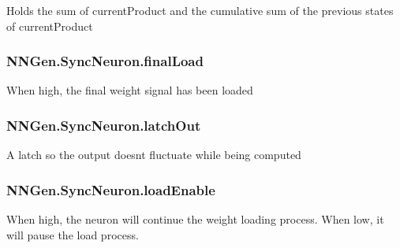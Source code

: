 Holds the sum of current\+Product and the cumulative sum of the previous states of current\+Product 

\hypertarget{class_n_n_gen_1_1_sync_neuron_a871ce93f3b672a3425fec4ee5d55a5d5}{}
\subsubsection[{final\+Load}]{ N\+N\+Gen.\+Sync\+Neuron.\+final\+Load\hspace{0.3cm}{\ttfamily [get]}}\label{class_n_n_gen_1_1_sync_neuron_a871ce93f3b672a3425fec4ee5d55a5d5}


When high, the final weight signal has been loaded 

\hypertarget{class_n_n_gen_1_1_sync_neuron_ac80f32363948c3482290c24ef800fb8d}{}
\subsubsection[{latch\+Out}]{ N\+N\+Gen.\+Sync\+Neuron.\+latch\+Out\hspace{0.3cm}{\ttfamily [get]}}\label{class_n_n_gen_1_1_sync_neuron_ac80f32363948c3482290c24ef800fb8d}


A latch so the output doesn\textquotesingle{}t fluctuate while being computed 

\hypertarget{class_n_n_gen_1_1_sync_neuron_a5cb034f95e9d284d3638f9e817c3f26f}{}
\subsubsection[{load\+Enable}]{ N\+N\+Gen.\+Sync\+Neuron.\+load\+Enable\hspace{0.3cm}{\ttfamily [get]}}\label{class_n_n_gen_1_1_sync_neuron_a5cb034f95e9d284d3638f9e817c3f26f}


When high, the neuron will continue the weight loading process. When low, it will pause the load process. 

